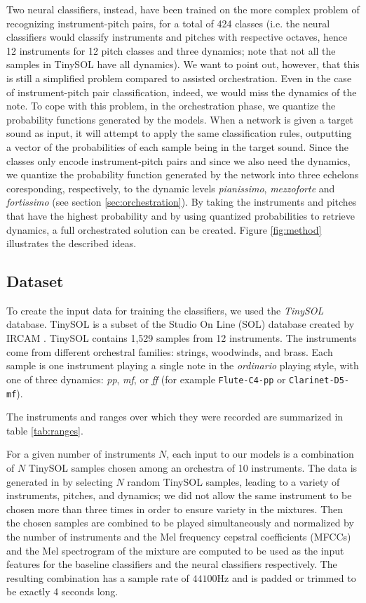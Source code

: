\documentclass[runningheads,a4paper]{llncs}
\begin{document}
Two neural classifiers, instead, have been trained on the more complex problem of recognizing instrument-pitch pairs, for a total of 424 classes (i.e. the neural classifiers would classify instruments and pitches with respective octaves, hence 12 instruments for 12 pitch classes and three dynamics; note that not all the samples in TinySOL have all dynamics). We want to point out, however, that this is still a simplified problem compared to assisted orchestration. Even in the case of instrument-pitch pair classification, indeed, we would miss the dynamics of the note. To cope with this problem, in the orchestration phase, we quantize the probability functions generated by the models. When a network is given a target sound as input, it will attempt to apply the same classification rules, outputting a vector of the probabilities of each sample being in the target sound. Since the classes only encode instrument-pitch pairs and since we also need the dynamics, we quantize the probability function generated by the network into three echelons coresponding, respectively, to the dynamic levels \emph{pianissimo}, \emph{mezzoforte} and \emph{fortissimo} (see section \ref{sec:orchestration}). By taking the instruments and pitches that have the highest probability and by using quantized probabilities to retrieve dynamics, a full orchestrated solution can be created.  Figure \ref{fig:method} illustrates the described ideas.

\subsection{Dataset}
\label{sec:dataset}

To create the input data for training the classifiers, we used the \emph{TinySOL} database. TinySOL is a subset of the Studio On Line (SOL) database created by IRCAM \cite{Cella2020b}. TinySOL contains 1,529 samples from 12 instruments. The instruments come from different orchestral families: strings, woodwinds, and brass. Each sample is one instrument playing a single note in the \emph{ordinario} playing style, with one of three dynamics: \textit{pp}, \textit{mf}, or \textit{ff} (for example \texttt{Flute-C4-pp} or \texttt{Clarinet-D5-mf}). 

The instruments and ranges over which they were recorded are summarized in table \ref{tab:ranges}. 

For a given number of instruments $N$, each input to our models is a combination of $N$ TinySOL samples chosen among an orchestra of 10 instruments. The data is generated in by selecting $N$ random TinySOL samples, leading to a variety of instruments, pitches, and dynamics; we did not allow the same instrument to be chosen more than three times in order to ensure variety in the mixtures. Then the chosen samples are combined to be played simultaneously and normalized by the number of instruments and the Mel frequency cepstral coefficients (MFCCs) and the Mel spectrogram of the mixture are computed to be used as the input features for the baseline classifiers and the neural classifiers respectively. The resulting combination has a sample rate of $44100$Hz and is padded or trimmed to be exactly 4 seconds long.
\end{document}
